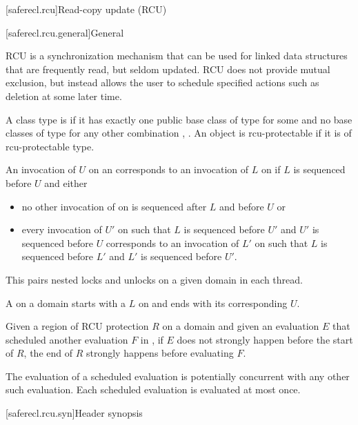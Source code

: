 
[saferecl.rcu]{Read-copy update (RCU)}

[saferecl.rcu.general]{General}

\pnum
RCU is a synchronization mechanism that can be used for linked data
structures that are frequently read, but seldom updated. RCU does
not provide mutual exclusion, but instead allows the user to schedule
specified actions such as deletion at some later time.

\pnum
A class type  is  if it has exactly one
public base class of type  for some 
and no base classes of type  for any other
combination , . An object is rcu-protectable if it is
of rcu-protectable type.

\pnum
An invocation of  $U$ on an  corresponds
to an invocation of  $L$ on  if $L$ is
sequenced before $U$ and either

\begin{itemize}
\item	no other invocation of  on  is sequenced
	after $L$ and before $U$ or
\item	every invocation of  $U'$ on  such
	that $L$ is sequenced before $U'$ and $U'$
	is sequenced before $U$ corresponds to an invocation of
	 $L'$ on  such that $L$ is sequenced
	before $L'$ and $L'$ is sequenced before $U'$.
\end{itemize}
\begin{note}
This pairs nested locks and unlocks on a given domain in each thread.
\end{note}

\pnum
A  on a domain  starts
with a  $L$ on  and ends with its corresponding
 $U$.

\pnum
Given a region of RCU protection $R$ on a domain 
and given an evaluation $E$ that scheduled another evaluation
$F$ in , if $E$ does not strongly happen before
the start of $R$, the end of $R$ strongly happens before
evaluating $F$.

\pnum
The evaluation of a scheduled evaluation is potentially concurrent with
any other such evaluation. Each scheduled evaluation is evaluated at
most once.

[saferecl.rcu.syn]{Header  synopsis}

